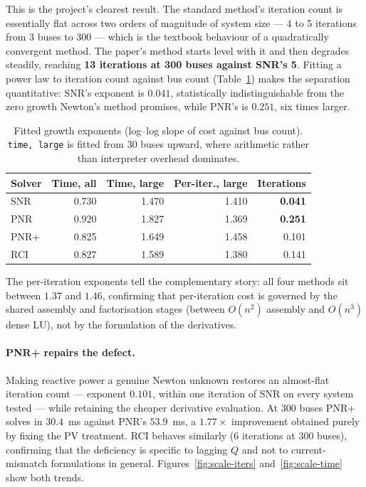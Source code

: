 \documentclass[sigconf,nonacm]{acmart}
\begin{document}
This is the project's clearest result. The standard method's iteration count is
essentially flat across two orders of magnitude of system size --- 4 to 5
iterations from 3 buses to 300 --- which is the textbook behaviour of a
quadratically convergent method. The paper's method starts level with it and
then degrades steadily, reaching \textbf{13 iterations at 300 buses against
SNR's 5}. Fitting a power law to iteration count against bus count
(Table~\ref{tab:exponents}) makes the separation quantitative: SNR's exponent is
$0.041$, statistically indistinguishable from the zero growth Newton's method
promises, while PNR's is $0.251$, six times larger.

\begin{table}[t]
\centering
\caption{Fitted growth exponents (log--log slope of cost against bus count).
\texttt{time, large} is fitted from 30 buses upward, where arithmetic rather than
interpreter overhead dominates.}
\label{tab:exponents}
\small
\begin{tabular}{l r r r r}
\toprule
Solver & Time, all & Time, large & Per-iter., large & Iterations \\
\midrule
SNR  & 0.730 & 1.470 & 1.410 & \textbf{0.041} \\
PNR  & 0.920 & 1.827 & 1.369 & \textbf{0.251} \\
PNR+ & 0.825 & 1.649 & 1.458 & 0.101 \\
RCI  & 0.827 & 1.589 & 1.380 & 0.141 \\
\bottomrule
\end{tabular}
\end{table}

The per-iteration exponents tell the complementary story: all four methods sit
between $1.37$ and $1.46$, confirming that per-iteration cost is governed by the
shared assembly and factorisation stages (between $O(n^2)$ assembly and $O(n^3)$
dense LU), not by the formulation of the derivatives.

\paragraph{PNR+ repairs the defect.}
Making reactive power a genuine Newton unknown restores an almost-flat iteration
count --- exponent $0.101$, within one iteration of SNR on every system tested
--- while retaining the cheaper derivative evaluation. At 300 buses PNR+ solves
in $30.4$~ms against PNR's $53.9$~ms, a $1.77\times$ improvement obtained purely
by fixing the PV treatment. RCI behaves similarly ($6$ iterations at 300 buses),
confirming that the deficiency is specific to lagging $Q$ and not to
current-mismatch formulations in general.
Figures~\ref{fig:scale-iters} and~\ref{fig:scale-time} show both trends.
\end{document}
